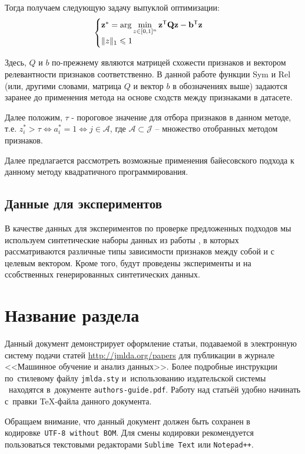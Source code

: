\documentclass[12pt, twoside]{article}
\newcommand{\bz}{\mathbf{z}}
\newcommand{\bb}{\mathbf{b}}
\newcommand{\bJ}{\mathcal{J}}
\newcommand{\bQ}{\mathbf{Q}}
\newcommand{\getT}{^{\mathsf{T}}}
\begin{document}
Тогда получаем следующую задачу выпуклой оптимизации:
\begin{equation*}
\begin{cases}
   $$ \bz^* = \arg \min_{z \in [0, 1]^n}  \bz \getT \bQ \bz - \bb \getT \bz$$  \\
   $$\|z\|_1 \le 1$$
 \end{cases}
 \end{equation*}

Здесь, $Q$ и $b$ по-прежнему являются матрицей схожести признаков и вектором релевантности признаков соответственно. В данной работе функции Sym и Rel (или, другими словами, матрица $Q$ и вектор $b$ в обозначениях выше) задаются заранее до применения метода на основе сходств между признаками в датасете.

Далее положим, $\tau$ - пороговое значение для отбора признаков в данном методе, т.е. $z_i^* > \tau \Leftrightarrow a_i^* = 1 \Leftrightarrow j \in \mathcal{A}$, где $\mathcal{A} \subset \bJ$ -- множество отобранных методом признаков.

Далее предлагается рассмотреть возможные применения байесовского подхода к данному методу квадратичного программирования.


\subsection{Данные для экспериментов}

В качестве данных для экспериментов по проверке предложенных подходов мы используем синтетические наборы данных из работы \cite{Katrutsa15}, в которых рассматриваются различные типы зависимости признаков между собой и с целевым вектором. Кроме того, будут проведены эксперименты и на ссобственных генерированных синтетических данных.




\section{Название раздела}
Данный документ демонстрирует оформление статьи,
подаваемой в электронную систему подачи статей \url{http://jmlda.org/papers} для публикации в журнале <<Машинное обучение и анализ данных>>.
Более подробные инструкции по~стилевому файлу \texttt{jmlda.sty} и~использованию издательской системы \LaTeXe\
находятся в~документе \texttt{authors-guide.pdf}.
Работу над статьёй удобно начинать с~правки \TeX-файла данного документа.

Обращаем внимание, что данный документ должен быть сохранен в кодировке~\verb'UTF-8 without BOM'.
Для смены кодировки рекомендуется пользоваться текстовыми редакторами \verb'Sublime Text' или \verb'Notepad++'.
\end{document}
